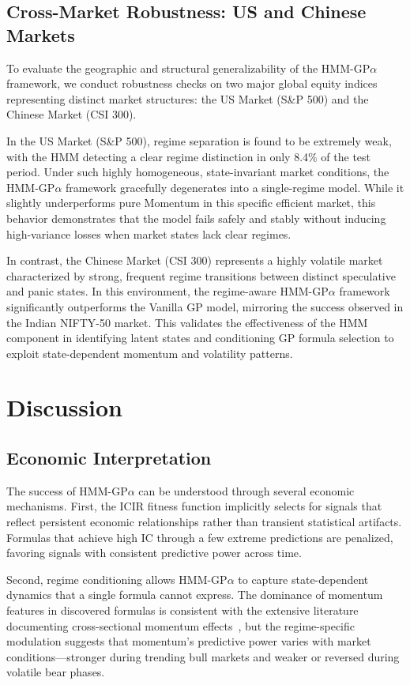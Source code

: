 \documentclass{ieeeaccess}
\newcommand{\revised}[1]{#1}
\begin{document}
\subsection{\revised{Cross-Market Robustness: US and Chinese Markets}}
\label{sec:cross_market}
\revised{To evaluate the geographic and structural generalizability of the HMM-GP$\alpha$ framework, we conduct robustness checks on two major global equity indices representing distinct market structures: the US Market (S\&P 500) and the Chinese Market (CSI 300).}

\revised{In the US Market (S\&P 500), regime separation is found to be extremely weak, with the HMM detecting a clear regime distinction in only 8.4\% of the test period. Under such highly homogeneous, state-invariant market conditions, the HMM-GP$\alpha$ framework gracefully degenerates into a single-regime model. While it slightly underperforms pure Momentum in this specific efficient market, this behavior demonstrates that the model fails safely and stably without inducing high-variance losses when market states lack clear regimes.}

\revised{In contrast, the Chinese Market (CSI 300) represents a highly volatile market characterized by strong, frequent regime transitions between distinct speculative and panic states. In this environment, the regime-aware HMM-GP$\alpha$ framework significantly outperforms the Vanilla GP model, mirroring the success observed in the Indian NIFTY-50 market. This validates the effectiveness of the HMM component in identifying latent states and conditioning GP formula selection to exploit state-dependent momentum and volatility patterns.}


\section{Discussion}
\label{sec:discussion}

\subsection{Economic Interpretation}
The success of HMM-GP$\alpha$ can be understood through several economic mechanisms. First, the ICIR fitness function implicitly selects for signals that reflect persistent economic relationships rather than transient statistical artifacts. Formulas that achieve high IC through a few extreme predictions are penalized, favoring signals with consistent predictive power across time.

Second, regime conditioning allows HMM-GP$\alpha$ to capture state-dependent dynamics that a single formula cannot express. The dominance of momentum features in discovered formulas is consistent with the extensive literature documenting cross-sectional momentum effects~\cite{b21}, but the regime-specific modulation suggests that momentum's predictive power varies with market conditions---stronger during trending bull markets and weaker or reversed during volatile bear phases.
\end{document}
